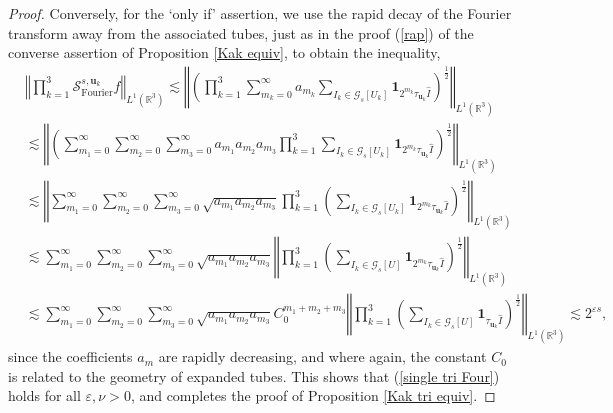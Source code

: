 \documentclass[10pt,a4paper]{amsart}
\begin{document}
\begin{proof}
Conversely, for the `only if' assertion, we use the rapid decay of the Fourier
transform away from the associated tubes, just as in the proof (\ref{rap}) of
the converse assertion of Proposition \ref{Kak equiv}, to obtain the
inequality,%
\begin{align*}
&  \left\Vert \prod_{k=1}^{3}\mathcal{S}_{\operatorname*{Fourier}%
}^{s,\mathbf{u}_{k}}f\right\Vert _{L^{1}\left(  \mathbb{R}^{3}\right)
}\lesssim\left\Vert \left(  \prod_{k=1}^{3}\sum_{m_{k}=0}^{\infty}a_{m_{k}%
}\sum_{I_{k}\in\mathcal{G}_{s}\left[  U_{k}\right]  }\mathbf{1}_{2^{m_{k}}%
\tau_{\mathbf{u}_{k}}\widehat{I}}\right)  ^{\frac{1}{2}}\right\Vert
_{L^{1}\left(  \mathbb{R}^{3}\right)  }\\
&  \lesssim\left\Vert \left(  \sum_{m_{1}=0}^{\infty}\sum_{m_{2}=0}^{\infty
}\sum_{m_{3}=0}^{\infty}a_{m_{1}}a_{m_{2}}a_{m_{3}}\prod_{k=1}^{3}\sum
_{I_{k}\in\mathcal{G}_{s}\left[  U_{k}\right]  }\mathbf{1}_{2^{m_{k}}%
\tau_{\mathbf{u}_{k}}\widehat{I}}\right)  ^{\frac{1}{2}}\right\Vert
_{L^{1}\left(  \mathbb{R}^{3}\right)  }\\
&  \lesssim\left\Vert \sum_{m_{1}=0}^{\infty}\sum_{m_{2}=0}^{\infty}%
\sum_{m_{3}=0}^{\infty}\sqrt{a_{m_{1}}a_{m_{2}}a_{m_{3}}}\prod_{k=1}%
^{3}\left(  \sum_{I_{k}\in\mathcal{G}_{s}\left[  U_{k}\right]  }%
\mathbf{1}_{2^{m_{k}}\tau_{\mathbf{u}_{k}}\widehat{I}}\right)  ^{\frac{1}{2}%
}\right\Vert _{L^{1}\left(  \mathbb{R}^{3}\right)  }\\
&  \lesssim\sum_{m_{1}=0}^{\infty}\sum_{m_{2}=0}^{\infty}\sum_{m_{3}%
=0}^{\infty}\sqrt{a_{m_{1}}a_{m_{2}}a_{m_{3}}}\left\Vert \prod_{k=1}%
^{3}\left(  \sum_{I_{k}\in\mathcal{G}_{s}\left[  U\right]  }\mathbf{1}%
_{2^{m_{k}}\tau_{\mathbf{u}_{k}}\widehat{I}}\right)  ^{\frac{1}{2}}\right\Vert
_{L^{1}\left(  \mathbb{R}^{3}\right)  }\\
&  \lesssim\sum_{m_{1}=0}^{\infty}\sum_{m_{2}=0}^{\infty}\sum_{m_{3}%
=0}^{\infty}\sqrt{a_{m_{1}}a_{m_{2}}a_{m_{3}}}C_{0}^{m_{1}+m_{2}+m_{3}%
}\left\Vert \prod_{k=1}^{3}\left(  \sum_{I_{k}\in\mathcal{G}_{s}\left[
U\right]  }\mathbf{1}_{\tau_{\mathbf{u}_{k}}\widehat{I}}\right)  ^{\frac{1}%
{2}}\right\Vert _{L^{1}\left(  \mathbb{R}^{3}\right)  }\lesssim2^{\varepsilon
s},
\end{align*}
since the coefficients $a_{m}$ are rapidly decreasing, and where again, the
constant $C_{0}$ is related to the geometry of expanded tubes. This shows that
(\ref{single tri Four}) holds for all $\varepsilon,\nu>0$, and completes the
proof of Proposition \ref{Kak tri equiv}.
\end{proof}
\end{document}
